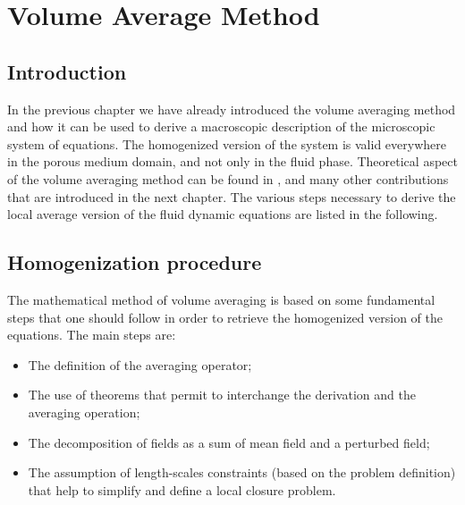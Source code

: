 \chapter{Volume Average Method}
\label{ch:vans}


\section{Introduction}

In the previous chapter we have already introduced the volume averaging method and how it can be used to derive a macroscopic description of the microscopic system of equations.
The homogenized version of the system is valid everywhere in the porous medium domain, and not only in the fluid phase.
Theoretical aspect of the volume averaging method can be found in \citet{whitaker2013method} \cite{whitaker1986flow} \cite{whitaker1996forchheimer}, \citet{quintard1994transport1} \cite{quintard1994transport2} \cite{quintard1994transport3} \cite{quintard1994transport4} \cite{quintard1994transport5} and many other contributions that are introduced in the next chapter.
The various steps necessary to derive the local average version of the fluid dynamic equations are listed in the following.

\section{Homogenization procedure}
The mathematical method of volume averaging is based on some fundamental steps that one should follow in order to retrieve the homogenized version of the equations.
The main steps are:
\begin{itemize}
\item The definition of the averaging operator;
\item The use of theorems that permit to interchange the derivation and the averaging operation;
\item The decomposition of fields as a sum of mean field and a perturbed field;
\item The assumption of length-scales constraints (based on the problem definition) that help to simplify and define a local closure  problem.
\end{itemize}

